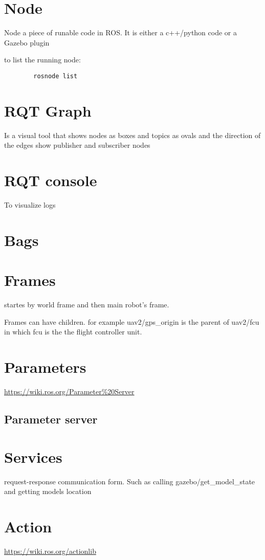 \section{Node}
    Node a piece of runable code in ROS. It is either a c++/python code or a Gazebo plugin

    to list the running node:
    \begin{verbatim}
        rosnode list
    \end{verbatim}
\section{RQT Graph}
    Is a visual tool that shows nodes as boxes and topics as ovals and the direction of the edges show publisher and subscriber nodes
\section{RQT console}
    To visualize logs
\section{Bags}
\section{Frames}
     startes by world frame and then main robot's frame.
    
    Frames can have children. for example uav2/gps\_origin is the parent of uav2/fcu in which fcu is the the flight controller unit.
\section{Parameters}
    \url{https://wiki.ros.org/Parameter%20Server}
    \subsection{Parameter server}
\section{Services}
    request-response communication form. Such as calling gazebo/get\_model\_state and getting models location
\section{Action}
    \url{https://wiki.ros.org/actionlib}
    
